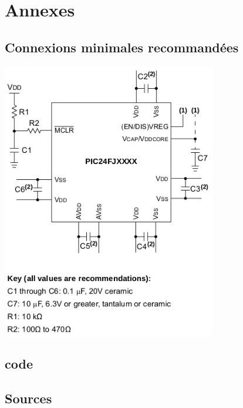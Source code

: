 \documentclass[12pt]{report}
\begin{document}
	\chapter{Annexes}
	\section{Connexions minimales recommandées}
	\label{sec:an3.1}
	\includegraphics[width=0.7\textwidth]{img/an1}
	\section{code}
	\section{Sources}
\end{document}
